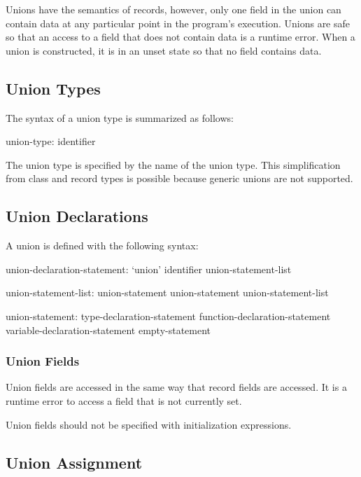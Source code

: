 \label{Unions}

Unions have the semantics of records, however, only one field in the
union can contain data at any particular point in the program's
execution.  Unions are safe so that an access to a field that does not
contain data is a runtime error.  When a union is constructed, it is
in an unset state so that no field contains data.

\subsection{Union Types}
\label{Union_Types}

The syntax of a union type is summarized as follows:
\begin{syntax}
union-type:
  identifier
\end{syntax}
The union type is specified by the name of the union type.  This
simplification from class and record types is possible because generic
unions are not supported.

\subsection{Union Declarations}
\label{Union_Declarations}

A union is defined with the following syntax:
\begin{syntax}
union-declaration-statement:
  `union' identifier { union-statement-list }

union-statement-list:
  union-statement
  union-statement union-statement-list

union-statement:
  type-declaration-statement
  function-declaration-statement
  variable-declaration-statement
  empty-statement
\end{syntax}

\subsubsection{Union Fields}
\label{Union_Fields}

Union fields are accessed in the same way that record fields are
accessed.  It is a runtime error to access a field that is not
currently set.

Union fields should not be specified with initialization expressions.

\subsection{Union Assignment}
\label{Union_Assignment}


